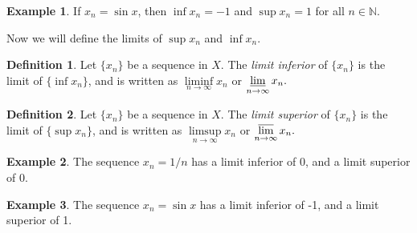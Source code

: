 \documentclass{article}
\newcommand{\N}{\mathbb{N}}
\theoremstyle{definition}
\newtheorem{definition}{Definition}[section]
\newtheorem{example}{Example}[section]
\begin{document}
\begin{example}
	If $ x_n=\sin x $, then $ \inf x_n=-1 $ and $ \sup x_n=1 $ for all $ n\in\N $. 
\end{example}
Now we will define the limits of $ \sup x_n $ and $ \inf x_n$.
\begin{definition}
	Let $ \{x_n\} $ be a sequence in $ X $. The \textit{\color{red}limit inferior} of $ \{x_n\} $ is the limit of $ \{\inf x_n\} $, and is written as  $\liminf\limits_{n\to\infty} x_n$ or $\varliminf\limits_{n\to\infty} x_n. $ 
\end{definition}
\begin{definition}
	Let $ \{x_n\} $ be a sequence in $ X $. The \textit{\color{red}limit superior} of $ \{x_n\} $ is the limit of $ \{\sup x_n\} $, and is written as  $\limsup\limits_{n\to\infty} x_n$ or $\varlimsup\limits_{n\to\infty} x_n. $ 
\end{definition}
\begin{example}
The sequence $ x_n=1/n $ has a limit inferior of 0, and a limit superior of 0. 
\end{example}
\begin{example}
The sequence $ x_n=\sin x $ has a limit inferior of -1, and a limit superior of 1. 
\end{example}
\end{document}
